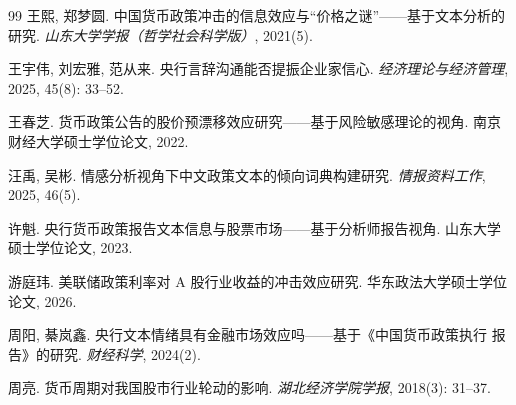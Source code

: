 \begin{thebibliography}{99}
王熙, 郑梦圆. 中国货币政策冲击的信息效应与“价格之谜”——基于文本分析的
研究. \textit{山东大学学报（哲学社会科学版）}, 2021(5).

王宇伟, 刘宏雅, 范从来. 央行言辞沟通能否提振企业家信心.
\textit{经济理论与经济管理}, 2025, 45(8): 33--52.

王春芝. 货币政策公告的股价预漂移效应研究——基于风险敏感理论的视角.
南京财经大学硕士学位论文, 2022.

汪禹, 吴彬. 情感分析视角下中文政策文本的倾向词典构建研究.
\textit{情报资料工作}, 2025, 46(5).

许魁. 央行货币政策报告文本信息与股票市场——基于分析师报告视角.
山东大学硕士学位论文, 2023.

游庭玮. 美联储政策利率对 A 股行业收益的冲击效应研究.
华东政法大学硕士学位论文, 2026.

周阳, 綦岚鑫. 央行文本情绪具有金融市场效应吗——基于《中国货币政策执行
报告》的研究. \textit{财经科学}, 2024(2).

周亮. 货币周期对我国股市行业轮动的影响.
\textit{湖北经济学院学报}, 2018(3): 31--37.

\end{thebibliography}

